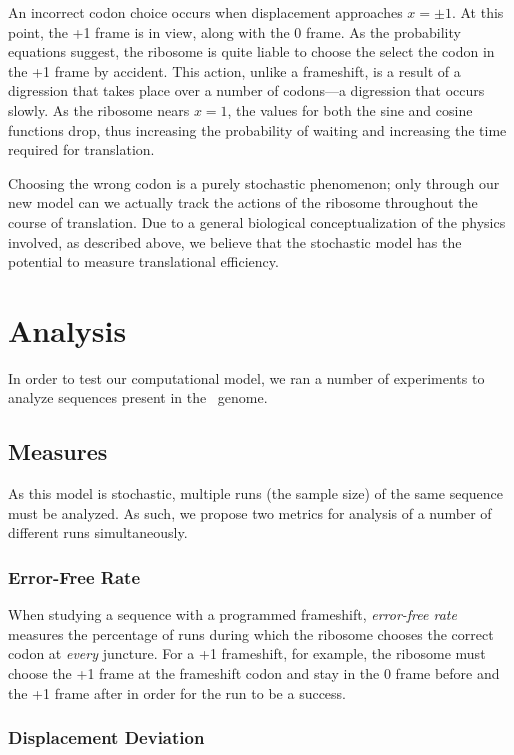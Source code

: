 \documentclass[12pt]{article}
\numberwithin{equation}{section}
\begin{document}
An incorrect codon choice occurs when displacement approaches $x = \pm 1$.
At this point, the +1 frame is in view, along with the 0 frame.  As the probability
equations suggest, the ribosome is quite liable to choose the select the codon
in the +1 frame by accident.  This action, unlike a frameshift, is a result
of a digression that takes place over a number of codons---a digression that
occurs slowly.  As the ribosome nears $x = 1$, the values for both the sine 
and cosine functions drop, thus increasing the probability of waiting and 
increasing the time required for translation.

Choosing the wrong codon is a purely stochastic phenomenon; only through our new
model can we actually track the actions of the ribosome throughout the course
of translation.  Due to a general biological conceptualization of the physics involved,
as described above, we believe that the stochastic model has the potential to 
measure translational efficiency.


\section{Analysis}
In order to test our computational model, we ran a number of
experiments to analyze sequences present in the \ecoli\ genome.

\subsection{Measures}
\label{section:metrics}

As this model is stochastic, multiple runs (the sample size) of the same sequence must be analyzed.
As such, we propose two metrics for analysis of a number of different runs 
simultaneously. 

\subsubsection{Error-Free Rate}
\label{section:efr}
When studying a
sequence with a programmed frameshift, \emph{error-free rate} measures the percentage of runs 
during which the ribosome chooses the correct codon
at \emph{every} juncture.  For a +1 frameshift, for example, the ribosome must
choose the +1 frame at the frameshift codon and stay in the 0 frame before
and the +1 frame after in order for the run to be a success.

\subsubsection{Displacement Deviation}
\label{section:deviation}
\end{document}
